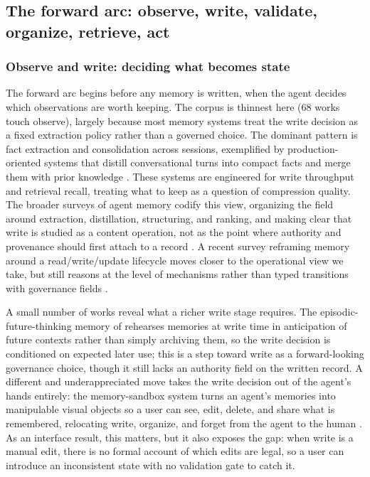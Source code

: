 \subsection{The forward arc: observe, write, validate, organize, retrieve, act}\label{subsec:forward}

\subsubsection{Observe and write: deciding what becomes state}

The forward arc begins before any memory is written, when the agent decides which observations are worth keeping. The corpus is thinnest here ($68$ works touch observe), largely because most memory systems treat the write decision as a fixed extraction policy rather than a governed choice. The dominant pattern is fact extraction and consolidation across sessions, exemplified by production-oriented systems that distill conversational turns into compact facts and merge them with prior knowledge \citep{chhikara2025mem0buildingproductionreadyai}. These systems are engineered for write throughput and retrieval recall, treating what to keep as a question of compression quality. The broader surveys of agent memory codify this view, organizing the field around extraction, distillation, structuring, and ranking, and making clear that write is studied as a content operation, not as the point where authority and provenance should first attach to a record \citep{zhang2024memorymechanism,du2026memoryautonomous,hu2025memoryageaiagents}. A recent survey reframing memory around a read/write/update lifecycle moves closer to the operational view we take, but still reasons at the level of mechanisms rather than typed transitions with governance fields \citep{huang2026rethinkingmemorymechanisms}.

A small number of works reveal what a richer write stage requires. The episodic-future-thinking memory of \citet{guo2026tmem} rehearses memories at write time in anticipation of future contexts rather than simply archiving them, so the write decision is conditioned on expected later use; this is a step toward write as a forward-looking governance choice, though it still lacks an authority field on the written record. A different and underappreciated move takes the write decision out of the agent's hands entirely: the memory-sandbox system turns an agent's memories into manipulable visual objects so a user can see, edit, delete, and share what is remembered, relocating write, organize, and forget from the agent to the human \citep{huang2023memorysandbox}. As an interface result, this matters, but it also exposes the gap: when write is a manual edit, there is no formal account of which edits are legal, so a user can introduce an inconsistent state with no validation gate to catch it.

